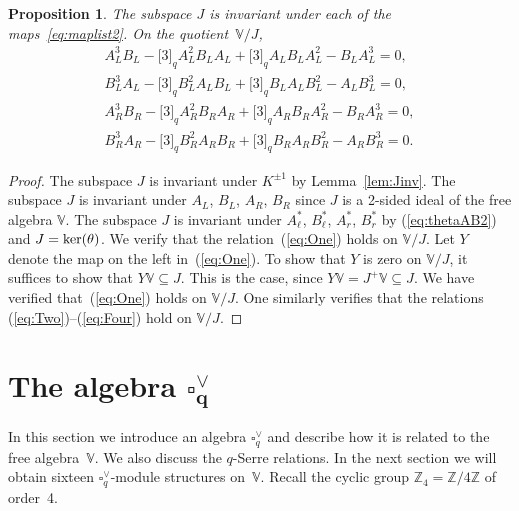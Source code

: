 \documentclass[pdftex]{sigma}
\numberwithin{equation}{section}
\newtheorem{Proposition}[Theorem]{Proposition}
 { \theoremstyle{definition}
\newtheorem{Definition}[Theorem]{Definition}
\newtheorem{Example}[Theorem]{Example}
\newtheorem{Note}[Theorem]{Note}
}
\begin{document}
\begin{Proposition}\label{prop:Jinv} The subspace $J$ is invariant under each of the maps~\eqref{eq:maplist2}. On the quotient~$\mathbb V/J$,
\begin{gather}\label{eq:One}
A_L^3 B_L-\lbrack 3 \rbrack_q A_L^2 B_L A_L+\lbrack 3 \rbrack_q A_L B_L A_L^2-B_L A_L^3 = 0,\\
\label{eq:Two}
B_L^3 A_L-\lbrack 3 \rbrack_q B_L^2 A_L B_L+\lbrack 3 \rbrack_q B_L A_L B_L^2-A_L B_L^3 = 0,\\
\label{eq:Three}
A_R^3 B_R-\lbrack 3 \rbrack_q A_R^2 B_R A_R+\lbrack 3 \rbrack_q A_R B_R A_R^2-B_R A_R^3 = 0,\\
\label{eq:Four}
B_R^3 A_R-\lbrack 3 \rbrack_q B_R^2 A_R B_R+\lbrack 3 \rbrack_q B_R A_R B_R^2-A_R B_R^3 = 0.
\end{gather}
\end{Proposition}
\begin{proof}The subspace $J$ is invariant under $K^{\pm 1}$ by Lemma~\ref{lem:Jinv}. The subspace $J$ is invariant under $A_L$, $B_L$, $A_R$, $B_R$ since $J$ is a 2-sided ideal of the free algebra $\mathbb V$. The subspace $J$ is invariant under $A^*_\ell$, $B^*_\ell$, $A^*_r$, $B^*_r$ by (\ref{eq:thetaAB2}) and $J={\rm ker}(\theta)$. We verify that the relation~(\ref{eq:One}) holds on $\mathbb V/J$. Let $Y$ denote the map on the left in~(\ref{eq:One}). To show that $Y$ is zero on $\mathbb V/J$, it suffices to show that $Y\mathbb V\subseteq J$. This is the case, since $Y\mathbb V = J^+\mathbb V\subseteq J$. We have verified that~(\ref{eq:One}) holds on $\mathbb V/J$. One similarly verifies that the relations (\ref{eq:Two})--(\ref{eq:Four}) hold on $\mathbb V/J$.
\end{proof}

\section[The algebra $\square^\vee_q$]{The algebra $\boldsymbol{\square^\vee_q}$}\label{section10}

In this section we introduce an algebra $\square^\vee_q$ and describe how it is related to the free algebra~$\mathbb V$. We also discuss the $q$-Serre relations. In the next section we will obtain sixteen $\square^\vee_q$-module structures on~$\mathbb V$. Recall the cyclic group $\mathbb Z_4 = \mathbb Z/4 \mathbb Z$ of order~4.
\end{document}
